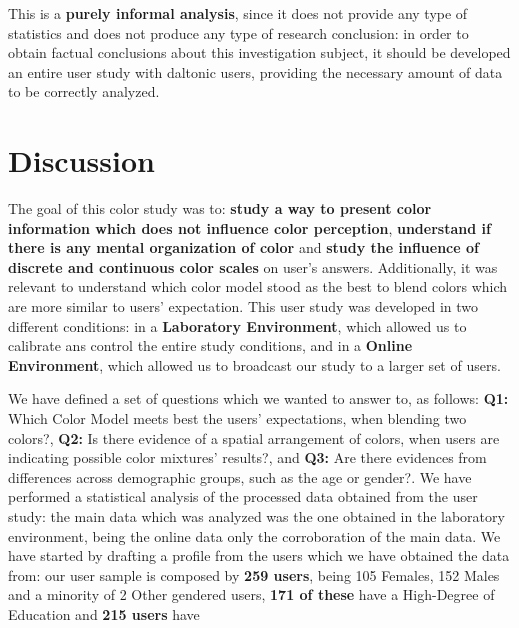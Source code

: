 %
This is a \textbf{purely informal analysis}, since it does not provide any type of statistics and does not produce any type of research conclusion: in order to obtain factual conclusions about this investigation subject, it should be developed an entire user study with daltonic users, providing the necessary amount of data to be correctly
analyzed.
%
%
\section{Discussion}
\label{sec:results_discussion}
%
The goal of this color study was to: \textbf{study a way to present color information which does not influence color perception}, \textbf{understand if there is any mental organization of color} and \textbf{study the influence of discrete and continuous color scales} on
user's answers. Additionally, it was relevant to understand which color model stood as the best to blend colors which are more similar to users' expectation. This user study was developed in two different conditions: in a \textbf{Laboratory Environment}, which allowed us
to calibrate ans control the entire study conditions, and in a \textbf{Online Environment}, which allowed us to broadcast our study to a larger set of users. \par
%
We have defined a set of questions which we wanted to answer to, as follows:
\textbf{Q1:} Which Color Model meets best the users' expectations, when blending two colors?,
\textbf{Q2:} Is there evidence of a spatial arrangement of colors, when users are indicating possible color mixtures' results?, and
\textbf{Q3:} Are there evidences from differences across demographic groups, such as the age or gender?.
%
We have performed a statistical analysis of the processed data obtained from the user study: the main data which was analyzed was the one obtained in the laboratory environment, being the online data only the corroboration of the main data. We have started by drafting a
profile from the users which we have obtained the data from: our user sample is composed by \textbf{259 users}, being 105 Females, 152 Males and a minority of 2 Other gendered users, \textbf{171 of these} have a High-Degree of Education and \textbf{215 users} have
